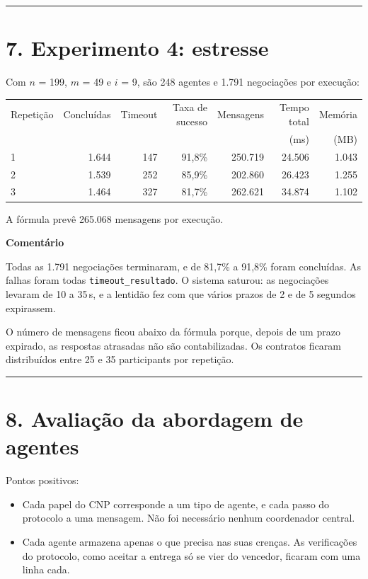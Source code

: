 \documentclass[11pt,a4paper]{article}
\newcommand{\cod}[1]{\texttt{#1}}
\newcommand{\separador}{\begin{center}\rule{0.45\linewidth}{0.4pt}\end{center}}
\begin{document}
\separador

\section*{7. Experimento 4: estresse}

Com $n$ = 199, $m$ = 49 e $i$ = 9, são 248 agentes e 1.791 negociações por execução:

\begin{center}
\small
\begin{tabular}{lrrrrrr}
\toprule
Repetição & Concluídas & Timeout & Taxa de sucesso & Mensagens & Tempo total & Memória \\
 &  &  &  &  & (ms) & (MB) \\
\midrule
1 & 1.644 & 147 & 91,8\% & 250.719 & 24.506 & 1.043 \\
2 & 1.539 & 252 & 85,9\% & 202.860 & 26.423 & 1.255 \\
3 & 1.464 & 327 & 81,7\% & 262.621 & 34.874 & 1.102 \\
\bottomrule
\end{tabular}
\end{center}

A fórmula prevê 265.068 mensagens por execução.

\textbf{Comentário}

Todas as 1.791 negociações terminaram, e de 81,7\% a 91,8\% foram concluídas. As falhas foram todas \cod{timeout\_resultado}. O sistema saturou: as negociações levaram de 10 a 35\,s, e a lentidão fez com que vários prazos de 2 e de 5 segundos expirassem.

O número de mensagens ficou abaixo da fórmula porque, depois de um prazo expirado, as respostas atrasadas não são contabilizadas. Os contratos ficaram distribuídos entre 25 e 35 participants por repetição.

\separador

\section*{8. Avaliação da abordagem de agentes}

Pontos positivos:

\begin{itemize}
  \item Cada papel do CNP corresponde a um tipo de agente, e cada passo do protocolo a uma mensagem. Não foi necessário nenhum coordenador central.
  \item Cada agente armazena apenas o que precisa nas suas crenças. As verificações do protocolo, como aceitar a entrega só se vier do vencedor, ficaram com uma linha cada.
\end{itemize}
\end{document}
